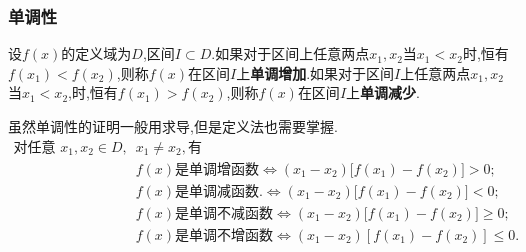 \documentclass[12pt, a4paper, oneside, UTF8]{ctexbook}  %
\begin{document}
\begin{sloppypar}
    \subsubsection{单调性}
    \begin{defn}{}{}
        设$f(x)$的定义域为$D$,区间$I \subset D$.如果对于区间上任意两点$x_1,x_2$当$x_1 < x_2$时,恒有$f(x_1) < f(x_2)$,则称$f(x)$在区间$I$上\textbf{单调增加}.如果对于区间$I$上任意两点$x_1,x_2$当$x_1<x_2$,时,恒有$f(x_1)>f(x_2)$,则称$f(x)$在区间$I$上\textbf{单调减少}.
    \end{defn}
    虽然单调性的证明一般用求导,但是定义法也需要掌握.
    $$
        \begin{aligned}
            \text{对任意 }x_1,x_2\in D, & x_1\neq x_2,\text{有}                  \\
                                     & f(x)\text{是单调增函数}
            \Leftrightarrow(x_{1}-x_{2})\Big[f(x_{1})-f(x_{2})\Big]{>}0;     \\
                                     & f(x)\text{是单调减函数}.
            \Leftrightarrow(x_{1}-x_{2})\Big[f(x_{1})-f(x_{2})\Big]<0;       \\
                                     & f(x)\text{是单调不减函数}
            \Leftrightarrow(x_1-x_2){\big[}f(x_1)-f(x_2){\big]}{\geqslant}0; \\
                                     & f(x)\text{是单调不增函数}
            \Leftrightarrow(x_1-x_2){\left[f(x_1)-f(x_2)\right]}\leqslant0.
        \end{aligned}
    $$

\end{sloppypar}
\end{document}

